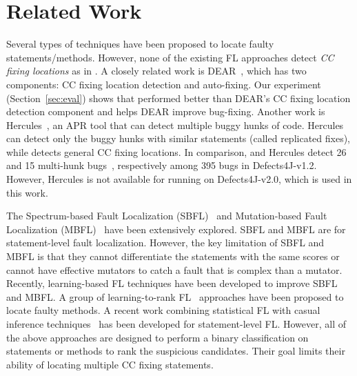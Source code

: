 \section{Related Work}

Several types of techniques have been proposed to locate faulty
statements/methods. However, none of the existing FL approaches detect
{\em CC fixing locations} as in {\tool}. A closely related work is
DEAR~\cite{icse22}, which has two components: CC fixing
location detection and auto-fixing. Our experiment
(Section~\ref{sec:eval}) shows that {\tool} performed better than
DEAR's CC fixing location detection component and helps DEAR
improve bug-fixing. Another work is
Hercules~\cite{hercules-icse19}, an APR tool that can detect multiple
buggy hunks of code. Hercules can detect only the buggy hunks with
similar statements (called replicated fixes), while {\tool} detects
general CC fixing locations. In comparison, {\tool} and Hercules
detect 26 and 15 multi-hunk bugs~\cite{hercules-icse19}, respectively
among 395 bugs in Defects4J-v1.2. However, Hercules is not available
for running on Defects4J-v2.0, which is used in this work.

The Spectrum-based Fault Localization
(SBFL)~\cite{zhang2011localizing, abreu2007accuracy,
  jones2005empirical, abreu2006evaluation, naish2011model,
  wong2007effective, liblit-pldi05, lucia2014extended} and
Mutation-based Fault Localization (MBFL)~\cite{Metallaxis, MUSE,
  zhang2013injecting, budd1981mutation, zhang2010test, musco2017large}
have been extensively explored. SBFL and MBFL are for statement-level
fault localization. However, the key limitation of SBFL and MBFL is
that they cannot differentiate the statements with the same scores or
cannot have effective mutators to catch a fault that is complex than a
mutator. Recently, learning-based FL techniques have been developed to
improve SBFL and MBFL.
A group of learning-to-rank
FL~\cite{MULTRIC,TraPT,b2016learning,sohn2017fluccs} approaches have
been proposed to locate faulty methods.
A recent work combining statistical FL with casual inference
techniques~\cite{kuccuk2021improving} has been developed for
statement-level FL. However, all of the above approaches are designed
to perform a binary classification on statements or methods to rank
the suspicious candidates. Their goal limits their ability of locating
multiple CC fixing statements.

